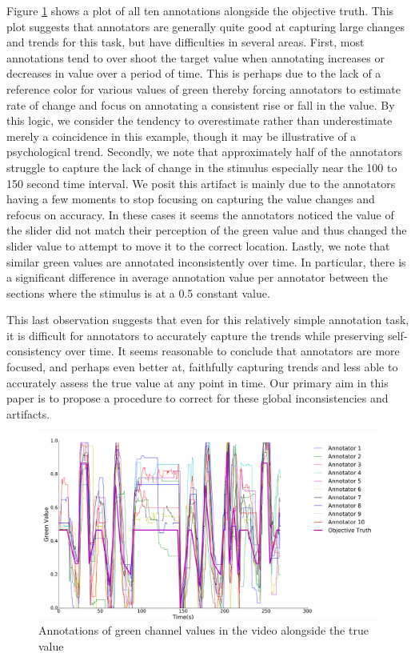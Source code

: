 \documentclass[]{article}
\begin{document}
Figure \ref{fig:annotations_ot} shows a plot of all ten annotations alongside the objective truth.  This plot suggests that annotators are generally quite good at capturing large changes and trends for this task, but have difficulties in several areas.  First, most annotations tend to over shoot the target value when annotating increases or decreases in value over a period of time.  This is perhaps due to the lack of a reference color for various values of green thereby forcing annotators to estimate rate of change and focus on annotating a consistent rise or fall in the value.  By this logic, we consider the tendency to overestimate rather than underestimate merely a coincidence in this example, though it may be illustrative of a psychological trend.  Secondly, we note that approximately half of the annotators struggle to capture the lack of change in the stimulus especially near the 100 to 150 second time interval.  We posit this artifact is mainly due to the annotators having a few moments to stop focusing on capturing the value changes and refocus on accuracy.  In these cases it seems the annotators noticed the value of the slider did not match their perception of the green value and thus changed the slider value to attempt to move it to the correct location.  Lastly, we note that similar green values are annotated inconsistently over time.  In particular, there is a significant difference in average annotation value per annotator between the sections where the stimulus is at a 0.5 constant value.

This last observation suggests that even for this relatively simple annotation task, it is difficult for annotators to accurately capture the trends while preserving self-consistency over time.  It seems reasonable to conclude that annotators are more focused, and perhaps even better at, faithfully capturing trends and less able to accurately assess the true value at any point in time.  Our primary aim in this paper is to propose a procedure to correct for these global inconsistencies and artifacts.

\begin{figure}
	\centering
	\includegraphics[width=1.0\textwidth]{images/annotations_ot}
	\caption{Annotations of green channel values in the video alongside the true value}
	\label{fig:annotations_ot}
\end{figure}
\end{document}
